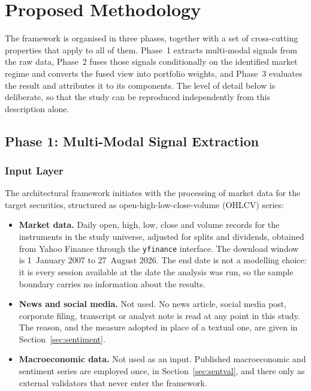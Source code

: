 \section{Proposed Methodology}
\label{sec:method}

The framework is organised in three phases, together with a set of cross-cutting
properties that apply to all of them. Phase~1 extracts multi-modal signals from the raw
data, Phase~2 fuses those signals conditionally on the identified market regime and
converts the fused view into portfolio weights, and Phase~3 evaluates the result and
attributes it to its components. The level of detail below is deliberate, so that the
study can be reproduced independently from this description alone.

\subsection{Phase 1: Multi-Modal Signal Extraction}

\subsubsection{Input Layer}

The architectural framework initiates with the processing of market data for the target
securities, structured as open-high-low-close-volume (OHLCV) series:

\begin{itemize}
\item \textbf{Market data.} Daily open, high, low, close and volume records for the
instruments in the study universe, adjusted for splits and dividends, obtained from
Yahoo Finance through the \texttt{yfinance} interface. The download window is
1~January 2007 to 27~August 2026. The end date is not a modelling choice: it is every
session available at the date the analysis was run, so the sample boundary carries no
information about the results.
\item \textbf{News and social media.} Not used. No news article, social media post,
corporate filing, transcript or analyst note is read at any point in this study. The
reason, and the measure adopted in place of a textual one, are given in
Section~\ref{sec:sentiment}.
\item \textbf{Macroeconomic data.} Not used as an input. Published macroeconomic and
sentiment series are employed once, in Section~\ref{sec:sentval}, and there only as
external validators that never enter the framework.
\end{itemize}

